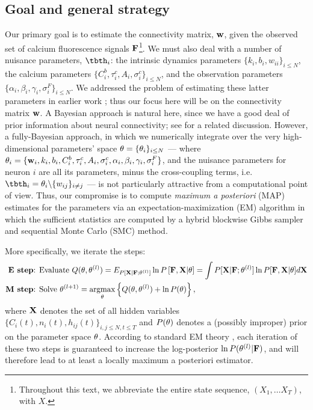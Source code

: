 \subsection{Goal and general strategy}  \label{sec:methods:goal}

Our primary goal is to estimate the connectivity matrix, $\mathbf{w}$, given the observed set of calcium fluorescence signals ${\bf F}$\footnote{Throughout this text, we abbreviate the entire state sequence, $(X_1, \ldots X_T)$, with $X$.}. We must also deal with a number of nuisance parameters, $\tbth_i$: the intrinsic dynamics parameters $\{k_i, b_i, w_{ii}\}_{i\leq N}$, the calcium parameters $\{C^b_i, \tau^c_i, A_i, \sigma^c_i\}_{i\leq N}$, and the observation parameters $\{\alpha_i, \beta_i, \gamma_i, \sigma^F_i\}_{i\leq N}$. We addressed the problem of estimating these latter parameters in earlier work \cite{Vogelstein2009}; thus our focus here will be on the connectivity matrix $\mathbf{w}$. A Bayesian approach is natural here, since we have a good deal of prior information about neural connectivity; see \cite{Rigat06} for a related discussion. However, a fully-Bayesian approach, in which we numerically integrate over the very high-dimensional parameters' space $\mathbf{\theta}= \{\mathbf{\theta}_i\}_{i\leq N}$ --- where $\mathbf{\theta}_i=\{\mathbf{w}_i, k_i, b_i, C^b_i, \tau^c_i, A_i, \sigma^c_i, \alpha_i, \beta_i, \gamma_i, \sigma^F_i\}$, and the nuisance parameters for neuron $i$ are all its parameters, minus the cross-coupling terms, i.e.\ $\tbth_i =\bth_i \backslash \{w_{ij}\}_{i\neq j}$ --- is not particularly attractive from a computational point of view. Thus, our compromise is to compute \emph{maximum a posteriori} (MAP) estimates for the parameters via an expectation-maximization (EM) algorithm in which the sufficient statistics are computed by a hybrid blockwise Gibbs sampler and sequential Monte Carlo (SMC) method.

More specifically, we iterate the steps:
\begin{align*}
\textbf{E step} &\text{: Evaluate } Q(\bth,\bth^{(l)}) = E_{P[\bX |
\bF; \bth^{(l)}]} \ln P \left[ \bF, \bX | \bth \right] = \int P[\bX |
\bF; \bth^{(l)}] \ln P[\bF, \bX | \bth] d \bX \\ \textbf{M step}
&\text{: Solve } \bth^{(l+1)} = \argmax_{\bth} \left\{
Q(\bth,\bth^{(l)}) + \ln P(\bth) \right\},
\end{align*}
where ${\bf X}$ denotes the set of all hidden variables $\{ C_i(t), n_i(t), h_{ij}(t) \}_{i,j \leq N, t \leq T}$ and $P(\mathbf{\theta})$ denotes a (possibly improper) prior on the parameter space $\mathbf{\theta}$. According to standard EM theory \cite{DLR77,McLachlanKrishnan96}, each iteration of these two steps is guaranteed to increase the log-posterior $\ln P(\mathbf{\theta}^{(l)} | {\bf F})$, and will therefore lead to at least a locally maximum a posteriori estimator.

